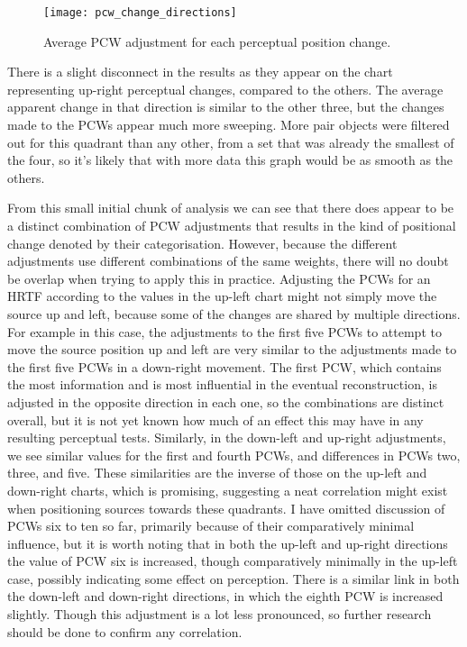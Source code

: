 \begin{figure}
	\caption{Average PCW adjustment for each perceptual position change.}
	\centering
		\texttt{[image: pcw\_change\_directions]}
	
\end{figure}

There is a slight disconnect in the results as they appear on the chart representing up-right perceptual changes, compared to the others. The average apparent change in that direction is similar to the other three, but the changes made to the PCWs appear much more sweeping. More pair objects were filtered out for this quadrant than any other, from a set that was already the smallest of the four, so it's likely that with more data this graph would be as smooth as the others. 

From this small initial chunk of analysis we can see that there does appear to be a distinct combination of PCW adjustments that results in the kind of positional change denoted by their categorisation. However, because the different adjustments use different combinations of the same weights, there will no doubt be overlap when trying to apply this in practice. Adjusting the PCWs for an HRTF according to the values in the up-left chart might not simply move the source up and left, because some of the changes are shared by multiple directions. For example in this case, the adjustments to the first five PCWs to attempt to move the source position up and left are very similar to the adjustments made to the first five PCWs in a down-right movement. The first PCW, which contains the most information and is most influential in the eventual reconstruction, is adjusted in the opposite direction in each one, so the combinations are distinct overall, but it is not yet known how much of an effect this may have in any resulting perceptual tests. Similarly, in the down-left and up-right adjustments, we see similar values for the first and fourth PCWs, and differences in PCWs two, three, and five. These similarities are the inverse of those on the up-left and down-right charts, which is promising, suggesting a neat correlation might exist when positioning sources towards these quadrants. I have omitted discussion of PCWs six to ten so far, primarily because of their comparatively minimal influence, but it is worth noting that in both the up-left and up-right directions the value of PCW six is increased, though comparatively minimally in the up-left case, possibly indicating some effect on perception. There is a similar link in both the down-left and down-right directions, in which the eighth PCW is increased slightly. Though this adjustment is a lot less pronounced, so further research should be done to confirm any correlation.